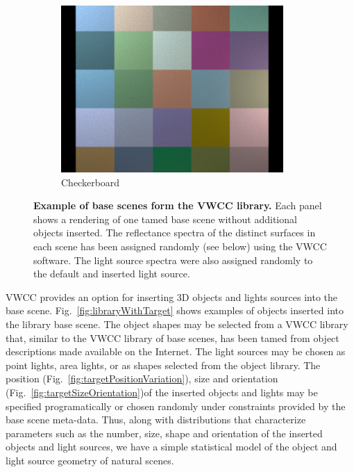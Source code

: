 \documentclass{jov}
\begin{document}
\begin{figure}[t]
\begin{subfigure}[b]{0.22 \textwidth}
        \includegraphics[width=\textwidth]{../Figures/Figure3/Figure3_f.png}
        \caption{Checkerboard}
        \label{fig:baseSceneCheckerBoard}
    \end{subfigure}
    \caption{{\bf Example of base scenes form the VWCC library.} Each panel shows a rendering of one tamed base scene without additional objects inserted.  The reflectance spectra of the distinct surfaces in each scene has been assigned randomly (see below) using the VWCC software.  The light source spectra were also assigned randomly to the default and inserted light source.}\label{fig:baseScenes}
\end{figure}

VWCC provides an option for inserting 3D objects and lights sources into the base scene. Fig.~\ref{fig:libraryWithTarget} shows examples of objects inserted into the library base scene. The object shapes may be selected from a VWCC library that, similar to the VWCC library of base scenes, has been tamed from object descriptions made available on the Internet. The light sources may be chosen as point lights, area lights, or as shapes selected from the object library. The position (Fig.~\ref{fig:targetPositionVariation}), size and orientation (Fig.~\ref{fig:targetSizeOrientation})of the inserted objects and lights may be specified programatically or chosen randomly under constraints provided by the base scene meta-data. Thus, along with distributions that characterize parameters such as the number, size, shape and orientation of the inserted objects and light sources, we have a simple statistical model of the object and light source geometry of natural scenes. 
\end{document}
